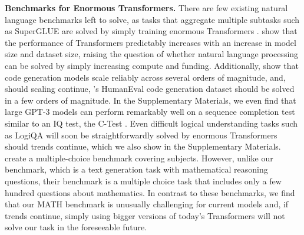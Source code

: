 \documentclass{article}
\begin{document}
\textbf{Benchmarks for Enormous Transformers.}\quad
There are few existing natural language benchmarks left to solve, as tasks that aggregate multiple subtasks such as SuperGLUE \citep{Wang2019SuperGLUEAS} are solved by simply training enormous Transformers \citep{He2020DeBERTaDB}.
\citet{Kaplan2020ScalingLF, Henighan2020ScalingLF} show that the performance of Transformers predictably increases with an increase in model size and dataset size, raising the question of whether natural language processing can be solved by simply increasing compute and funding.
Additionally, \citet{Chen2021EvaluatingLL,Austin2021ProgramSW} show that code generation models scale reliably across several orders of magnitude, and, should scaling continue, \citet{Chen2021EvaluatingLL}'s HumanEval code generation dataset should be solved in a few orders of magnitude.
In the Supplementary Materials, we even find that large GPT-3 models can perform remarkably well on a sequence completion test similar to an IQ test, the C-Test \citep{ctest,Legg2007UniversalIA}. Even difficult logical understanding tasks such as LogiQA \citep{Liu2020LogiQAAC} will soon be straightforwardly solved by enormous Transformers should trends continue, which we also show in the Supplementary Materials. \citet{Hendrycks2020MeasuringMM} create a multiple-choice benchmark covering  subjects. However, unlike our benchmark, which is a text generation task with  mathematical reasoning questions, their benchmark is a multiple choice task that includes only a few hundred questions about mathematics. 
In contrast to these benchmarks, we find that our MATH benchmark is unusually challenging for current models and, if trends continue, simply using bigger versions of today's Transformers will not solve our task in the foreseeable future.
\end{document}
